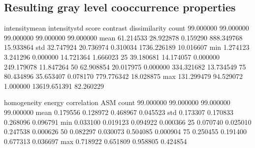\documentclass[letterpaper,10pt,english]{sphinxmanual}
\begin{document}
\noindent{}


\subsection{Resulting gray level co\sphinxhyphen{}occurrence properties}
\label{\detokenize{06-AdvancedShapeAndTexture:id1}}
\begin{sphinxVerbatim}[commandchars=\\\{\}]
   
  
\PYG{p}{[}\PYG{p}{]}  \PYG{p}{[}\PYG{p}{]}
            
\end{sphinxVerbatim}

\begin{sphinxVerbatim}[commandchars=\\\{\}]
       intensity\PYGZus{}mean  intensity\PYGZus{}std      score      contrast  dissimilarity  \PYGZbs{}
count       99.000000      99.000000  99.000000     99.000000      99.000000   
mean        61.214533      28.922878   0.159290    888.349768      15.933864   
std         32.747924      20.736974   0.310034   1736.226189      10.016607   
min          1.274123       3.241296   0.000000     14.721364       1.666023   
25\PYGZpc{}         39.180681      14.174057   0.000000    249.179078      11.847264   
50\PYGZpc{}         62.908854      20.017975   0.000000    334.321682      13.734549   
75\PYGZpc{}         80.434896      35.653407   0.078170    779.776342      18.028875   
max        131.299479      94.529072   1.000000  13619.651391      82.260229   

       homogeneity     energy  correlation        ASM  
count    99.000000  99.000000    99.000000  99.000000  
mean      0.179556   0.128972     0.468967   0.045523  
std       0.173307   0.170833     0.268096   0.096791  
min       0.033100   0.019123    \PYGZhy{}0.094922   0.000366  
25\PYGZpc{}       0.070740   0.025010     0.247538   0.000626  
50\PYGZpc{}       0.082297   0.030073     0.504085   0.000904  
75\PYGZpc{}       0.250455   0.191400     0.677313   0.036697  
max       0.718922   0.651809     0.958805   0.424854  
\end{sphinxVerbatim}
\end{document}
